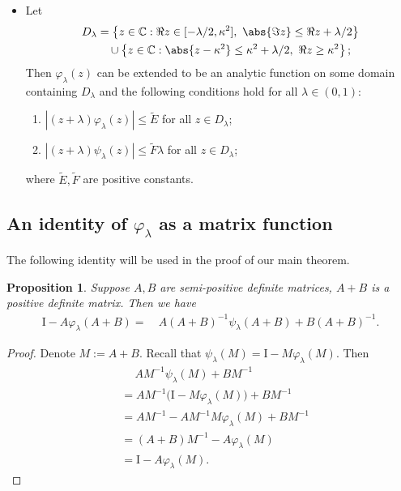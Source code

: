\documentclass{article}
\theoremstyle{plain}
\newtheorem{proposition}[theorem]{Proposition}
\theoremstyle{definition}
\theoremstyle{remark}
\newcommand{\bbC}{\mathbb{C}}
\newcommand{\reg}{\varphi_\lambda}
\newcommand{\rem}{\psi_\lambda}
\begin{document}
\begin{appendix}
\begin{itemize}
    \item Let
  \begin{align*}
    D_{\lambda} &= \left\{ z \in \bbC : \Re z \in [-\lambda/2,\kappa^2], ~ \abs{\Im z} \leq \Re z + \lambda/2 \right\} \\
    & \quad \cup \left\{ z \in \bbC : \abs{z - \kappa^2} \leq \kappa^2 + \lambda/2,~ \Re z \geq \kappa^2  \right\};
  \end{align*}
  Then $\reg(z)$ can be extended to be an analytic function on some domain containing $D_\lambda$
  and the following conditions hold for all $\lambda \in (0,1)$:
  \begin{enumerate}
    \item[(C1)] $\left|(z+\lambda)\reg(z)\right| \leq \tilde{E}$ for all $z \in D_\lambda$;
    \item[(C2)] $\left| (z+\lambda)\rem(z)\right| \leq \tilde{F} \lambda$ for all  $z \in D_\lambda$;
  \end{enumerate}
  where  $\tilde{E}, \tilde{F}$ are positive constants.
\end{itemize}





\subsection{An identity of $\reg$ as a matrix function}

The following identity will be used in the proof of our main theorem.

\begin{proposition}\label{prop_matrix_prop_1_of_filter}
    Suppose $A, B$ are semi-positive definite matrices, $A+B$ is a positive definite matrix. Then we have
    \begin{align*}
        \mathrm{I}-A\reg(A+B) =&~ A(A+B)^{-1}\rem(A+B) + B(A+B)^{-1}.
    \end{align*}
\end{proposition}
\begin{proof}
Denote $M:=A+B$. Recall that $\rem(M) = \mathrm{I} - M \reg(M)$. Then
\begin{align*}
    &\quad~ A M^{-1}\rem(M) + B M^{-1} \\
    &= A M^{-1}\big(\mathrm{I} - M \reg(M)\big) + B M^{-1} \\
    &= A M^{-1} - A M^{-1} M \reg(M) + B M^{-1} \\
    &= (A+B) M^{-1} - A \reg(M) \\
    &= \mathrm{I} - A \reg(M).
\end{align*}
\end{proof}



\end{appendix}
\end{document}
